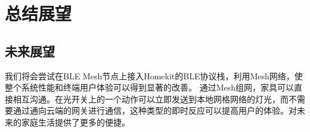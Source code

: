 \chapter{总结展望}

\section{未来展望}
我们将会尝试在BLE Mesh节点上接入Homekit的BLE协议栈，利用Mesh网络，使整个系统性能和终端用户体验可以得到显著的改善。 通过Mesh组网，家具可以直接相互沟通。在光开关上的一个动作可以立即发送到本地网格网络的灯光，而不需要通过通向云端的网关进行通信，这种类型的即时反应可以提高用户的体验。对未来的家庭生活提供了更多的便捷。